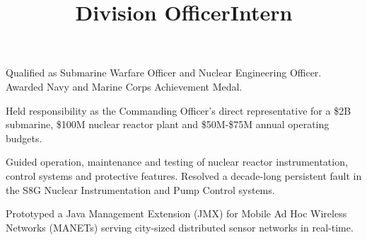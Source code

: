 \documentclass[line]{res}
\begin{document}
\begin{resume}
\title{{\bf Division Officer}}
\begin{position}
\vspace*{-.2cm}
\begin{list2}
	\item Qualified as Submarine Warfare Officer and Nuclear Engineering Officer. Awarded Navy and Marine Corps Achievement Medal.
	\item Held responsibility as the Commanding Officer's direct representative for a \$2B submarine, \$100M nuclear reactor plant and \$50M-\$75M annual operating budgets. 
	\item Guided operation, maintenance and testing of nuclear reactor instrumentation, control systems and protective features. Resolved a decade-long persistent fault in the S8G Nuclear Instrumentation and Pump Control systems. 
\end{list2}
\end{position}

\title{{\bf Intern}}
\begin{position}
\vspace*{-.2cm}
\begin{list2}
	\item Prototyped a Java Management Extension (JMX) for Mobile Ad Hoc Wireless Networks (MANETs) serving city-sized distributed sensor networks in real-time.
\end{list2}
\end{position}

\end{resume}
\end{document}
